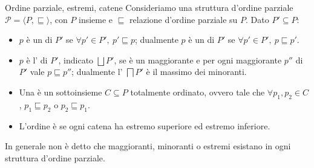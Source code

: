 \begin{definition}{Ordine parziale, estremi, catene}
  Consideriamo una struttura d'ordine parziale \(\mathcal{P} = \langle P, \sqsubseteq \rangle\), con \(P\) insieme e \(\sqsubseteq\) relazione d'ordine parziale su \(P\). Dato \(P'\subseteq P\):
  \begin{itemize}
    \item \(p\) è un  di \(P'\) se \(\forall p' \in P',\ p' \sqsubseteq p\); dualmente \(p\) è un  di \(P'\) se \(\forall p' \in P',\ p \sqsubseteq p'\).
    \item \(p\) è l' di \(P'\), indicato \(\bigsqcup P'\), se è un maggiorante e per ogni maggiorante \(p''\) di \(P'\) vale \(p \sqsubseteq p''\); dualmente l' \(\bigsqcap P'\) è il massimo dei minoranti.
    \item Una  è un sottoinsieme \(C\subseteq P\) totalmente ordinato, ovvero tale che \(\forall p_1, p_2 \in C\), \(p_1 \sqsubseteq p_2\) o \(p_2 \sqsubseteq p_1\).
    \item L'ordine è  se ogni catena ha estremo superiore ed estremo inferiore.
  \end{itemize}
\end{definition}

\begin{note}{}
  In generale non è detto che maggioranti, minoranti o estremi esistano in ogni struttura d'ordine parziale.
\end{note}

